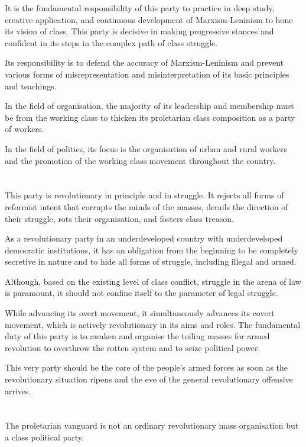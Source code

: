 It is the fundamental responsibility of this party 
to practice in deep study, 
creative application, 
and continuous development 
of Marxism-Leninism to hone its vision of class. 
This party is decisive in making progressive stances 
and confident in its steps in the complex path of class struggle.

Its responsibility is to defend the accuracy of Marxism-Leninism 
and prevent various forms of misrepresentation and misinterpretation 
of its basic principles and teachings.

In the field of organisation, 
the majority of its leadership and membership
must be from the working class 
to thicken its proletarian class composition 
as a party of workers.

In the field of politics, 
its focus is the organisation 
of urban and rural workers 
and the promotion of the working class movement 
throughout the country.


\section{}
This party is revolutionary in principle and in struggle. 
It rejects all forms of reformist intent 
that corrupts the minds of the masses, 
derails the direction of their struggle, 
rots their organisation,
and fosters class treason.

As a revolutionary party in an underdeveloped country 
with underdeveloped democratic institutions, 
it has an obligation from the beginning 
to be completely secretive in nature 
and to hide all forms of struggle,
including illegal and armed.

Although, based on the existing level of class conflict,
struggle in the arena of law is paramount,
it should not confine itself to the parameter of legal struggle.

While advancing its overt movement, 
it simultaneously advances its covert movement,
which is actively revolutionary in its aims and roles. 
The fundamental duty of this party 
is to awaken and organise the toiling masses 
for armed revolution to overthrow the rotten system 
and to seize political power.

This very party 
should be the core of the people's armed forces 
as soon as the revolutionary situation ripens 
and the eve of the general revolutionary offensive arrives.


\section{}
The proletarian vanguard is not 
an ordinary revolutionary mass organisation 
but a class political party.

